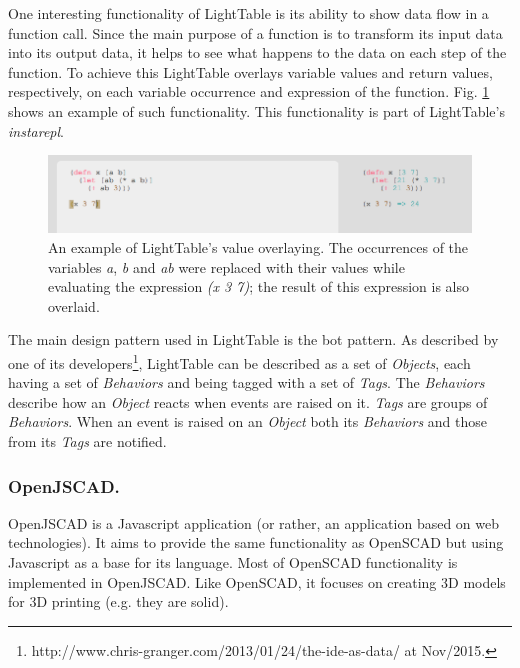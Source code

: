 \documentclass{./llncs2e/llncs}
\begin{document}
	One interesting functionality of LightTable is its ability to show data flow in a function call. 
	Since the main purpose of a function is to transform its input data into its output data, it helps to see what happens to the data on each step of the function. 
	To achieve this LightTable overlays variable values and return values, respectively, on each variable occurrence and expression of the function. 
	Fig. \ref{fig:lt:val:overlay} shows an example of such functionality. 
	This functionality is part of LightTable's \emph{instarepl}.

	\begin{figure}
		\centering
		\includegraphics[width=1.0\textwidth]{img/lt_val_overlay__inv}
			\caption{An example of LightTable's value overlaying. The occurrences of the variables \emph{a}, \emph{b} and \emph{ab} were replaced with their values while evaluating the expression \emph{(x 3 7)}; the result of this expression is also overlaid.}
		\label{fig:lt:val:overlay}
	\end{figure}

	The main design pattern used in LightTable is the \ac{bot} pattern. 
	As described by one of its developers\footnote{http://www.chris-granger.com/2013/01/24/the-ide-as-data/ at Nov/2015.}, LightTable can be described as a set of \emph{Objects}, each having a set of \emph{Behaviors} and being tagged with a set of \emph{Tags}. 
	The \emph{Behaviors} describe how an \emph{Object} reacts when events are raised on it. \emph{Tags} are groups of \emph{Behaviors}. 
	When an event is raised on an \emph{Object} both its \emph{Behaviors} and those from its \emph{Tags} are notified.

\subsubsection{OpenJSCAD.}
	OpenJSCAD\cite{openjscad2015site} is a Javascript application (or rather, an application based on web technologies).
	It aims to provide the same functionality as OpenSCAD but using Javascript as a base for its language. 
	Most of OpenSCAD functionality is implemented in OpenJSCAD. 
	Like OpenSCAD, it focuses on creating 3D models for 3D printing (e.g. they are solid).
\end{document}
